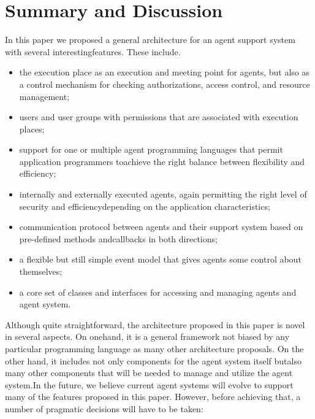 \documentclass{article}
\begin{document}
\section{Summary and Discussion}
In this paper we proposed a general architecture for an agent support system with several interestingfeatures. These include.
\begin{itemize}
    \item the execution place as an execution and meeting point for agents, but also as a control mechanism for checking authorizations, access control, and resource management;
    \item users and user groups with permissions that are associated with execution places;
    \item support for one or multiple agent programming languages that permit application programmers toachieve the right balance between flexibility and efficiency;
    \item internally and externally executed agents, again permitting the right level of security and efficiencydepending on the application characteristics;
    \item communication protocol between agents and their support system based on pre-defined methods andcallbacks in both directions;
    \item a flexible but still simple event model that gives agents some control about themselves;
    \item a core set of classes and interfaces for accessing and managing agents and agent system.
\end{itemize}
Although quite straightforward, the architecture proposed in this paper is novel in several aspects. On onehand, it is a general framework not biased by any particular programming language as many other architecture proposals. On the other hand, it includes not only components for the agent system itself butalso many other components that will be needed to manage and utilize the agent system.In the future, we believe current agent systems will evolve to support many of the features proposed in this paper. However, before achieving that, a number of pragmatic decisions will have to be taken:
\end{document}
